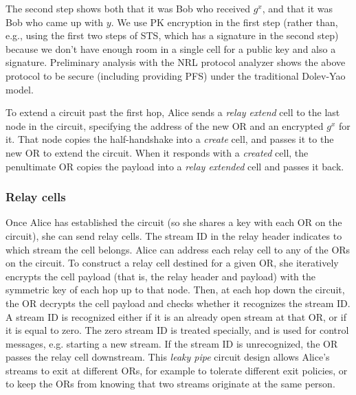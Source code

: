 \documentclass[times,10pt,twocolumn]{article}
\begin{document}
The second step shows both that it was Bob
who received $g^x$, and that it was Bob who came up with $y$. We use
PK encryption in the first step (rather than, e.g., using the first two
steps of STS, which has a signature in the second step) because we
don't have enough room in a single cell for a public key and also a
signature. Preliminary analysis with the NRL protocol analyzer shows
the above protocol to be secure (including providing PFS) under the
traditional Dolev-Yao model.

To extend a circuit past the first hop, Alice sends a \emph{relay extend}
cell to the last node in the circuit, specifying the address of the new
OR and an encrypted $g^x$ for it. That node copies the half-handshake
into a \emph{create} cell, and passes it to the new OR to extend the
circuit. When it responds with a \emph{created} cell, the penultimate OR
copies the payload into a \emph{relay extended} cell and passes it back.

\subsubsection{Relay cells}
Once Alice has established the circuit (so she shares a key with each
OR on the circuit), she can send relay cells.
The stream ID in the relay header indicates to which stream the cell belongs.
Alice can address each relay cell to any of the ORs on the circuit. To
construct a relay cell destined for a given OR, she iteratively
encrypts the cell payload (that is, the relay header and payload)
with the symmetric key of each hop up to that node. Then, at each hop
down the circuit, the OR decrypts the cell payload and checks whether
it recognizes the stream ID. A stream ID is recognized either if it
is an already open stream at that OR, or if it is equal to zero. The
zero stream ID is treated specially, and is used for control messages,
e.g. starting a new stream. If the stream ID is unrecognized, the OR
passes the relay cell downstream. This \emph{leaky pipe} circuit design
allows Alice's streams to exit at different ORs, for example to tolerate
different exit policies, or to keep the ORs from knowing that two streams
originate at the same person.
\end{document}
